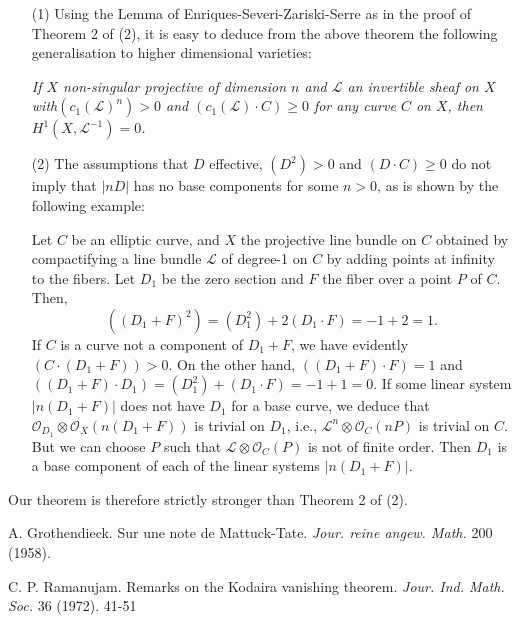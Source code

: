 \begin{remarks*}
\begin{itemize}
\item[(1)] Using the Lemma of Enriques-Severi-Zariski-Serre as in the proof of Theorem 2 of (2), it is easy to deduce from the above theorem the following generalisation to higher dimensional varieties:

{\em If $X$ non-singular projective of dimension $n$ and $\mathcal{L}$ an invertible sheaf on $X$ with\pageoriginale $(c_1 (\mathcal{L})^n)>0$ and $(c_1(\mathcal{L}) \cdot C ) \geqslant 0$ for any curve $C$ on $X$, then $H^1 (X, \mathcal{L}^{-1}) =0$.}


\item[(2)] The assumptions that $D$ effective, $(D^2) > 0$ and $(D \cdot C) \geqslant 0$ do not imply that $|nD|$ has no base components for some $n>0$, as is shown by the following example:

Let $C$ be an elliptic curve, and $X$ the projective line bundle on $C$ obtained by compactifying a line bundle $\mathcal{L}$ of degree-1 on $C$ by adding points at infinity to the fibers. Let $D_1$ be the zero section and $F$ the fiber over a point $P$ of $C$. Then,
$$
((D_1 + F)^2) = (D^2_1) +2 (D_1 \cdot F) = -1 +2 =1.
$$
If $C$ is a curve not a component of $D_1 + F$, we have evidently $(C \cdot (D_1 + F))>0$. On the other hand, $((D_1 + F) \cdot F) =1$ and $((D_1 + F) \cdot D_1) = (D^2_1) + (D_1 \cdot F) = -1 + 1 = 0$. If some linear system $|n(D_1 + F)|$ does not have $D_1$ for a base curve, we deduce that $\mathcal{O}_{D_1}\otimes \mathcal{O}_X (n(D_1 + F))$ is trivial on $D_1$, i.e., $\mathcal{L}^n \otimes \mathcal{O}_C (nP)$ is trivial on $C$. But we can choose $P$ such that $\mathcal{L} \otimes \mathcal{O}_C (P)$ is not of finite order. Then $D_1$ is a base component of each of the linear systems $|n(D_1 + F)|$.
\end{itemize}
\end{remarks*}

Our theorem is therefore strictly stronger than Theorem 2 of (2).

\begin{thebibliography}{99}
 A. Grothendieck. Sur une note de Mattuck-Tate. {\em Jour. reine angew. Math.} 200 (1958).

 C. P. Ramanujam. Remarks on the Kodaira vanishing theorem. {\em Jour. Ind. Math. Soc.} 36 (1972). 41-51
\end{thebibliography}

\vfill\eject
~\phantom{a}
\thispagestyle{empty}
